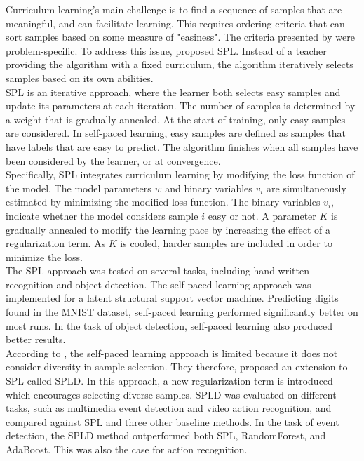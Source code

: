Curriculum learning's main challenge is to find a sequence of samples that are meaningful, and can facilitate learning. This requires ordering criteria that can sort samples based on some measure of "easiness". The criteria presented by \cite{Bengio_curriculumlearning} were problem-specific. To address this issue, \cite{Kumar_self_paced_learning} proposed \ac{SPL}. Instead of a teacher providing the algorithm with a fixed curriculum, the algorithm iteratively selects samples based on its own abilities. \\

\ac{SPL} is an iterative approach, where the learner both selects easy samples and update  its parameters at each iteration. The number of samples is determined by a weight that is gradually annealed. At the start of training, only easy samples are considered. In self-paced learning, easy samples are defined as samples that have labels that are easy to predict.
The algorithm finishes when all samples have been considered by the learner, or at convergence.\\

Specifically, \ac{SPL} integrates curriculum learning by modifying the loss function of the model. The model parameters $w$ and binary variables $v_{i}$ are simultaneously estimated by minimizing the modified loss function. The binary variables $v_{i}$, indicate whether the model considers sample $i$ easy or not.  A parameter $K$ is gradually annealed to modify the learning pace by increasing the effect of a regularization term. As $K$ is cooled, harder samples are included in order to minimize the loss. \\

The \ac{SPL} approach was tested on several tasks, including hand-written recognition and object detection. The self-paced learning approach was implemented for a latent structural support vector machine. Predicting digits found in the MNIST dataset, self-paced learning performed significantly better on most runs. In the task of object detection, self-paced learning also produced better results.  \\

According to \cite{Lu_self-paced_learning_diversity}, the self-paced learning approach is limited because it does not consider diversity in sample selection. They therefore, proposed an extension to \ac{SPL} called \ac{SPLD}. In this approach, a new regularization term is introduced which encourages selecting diverse samples. \ac{SPLD} was evaluated on different tasks, such as multimedia event detection and video action recognition, and compared against \ac{SPL} and three other baseline methods. In the task of event detection, the \ac{SPLD} method outperformed both \ac{SPL}, RandomForest, and AdaBoost. This was also the case for action recognition.\\

